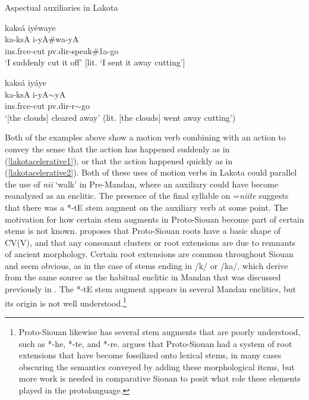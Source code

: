 \begin{exe}

\item\label{lakotacelerative} Aspectual auxiliaries in Lakota

	\begin{xlist}
	
	\item\label{lakotacelerative1}
	\glll kaksá iyéwaye\\
	ka-ksA i-yA\#wa-yA\\
	ins.frce-\textnormal{cut} pv.dir-\textnormal{speak}\#1a-\textnormal{go}\\
	\glt `I suddenly cut it off' [lit. `I sent it away cutting'] \citep[38]{ingham2003}

	\item\label{lakotacelerative2}
	\glll kaksá iyáye\\
	ka-ksA i-yA$\sim$yA\\
	ins.frce-\textnormal{cut} pv.dir-r$\sim$\textnormal{go}\\
	\glt `[the clouds] cleared away' (lit. [the clouds] went away cutting') \citep[38]{ingham2003}
	
	\end{xlist}

\end{exe}

Both of the examples above show a motion verb combining with an action to convey the sense that the action has happened suddenly as in (\ref{lakotacelerative1}), or that the action happened quickly as in (\ref{lakotacelerative2}). Both of these uses of motion verbs in Lakota could parallel the use of \textit{nii} `walk' in Pre-Mandan, where an auxiliary could have become reanalyzed as an enclitic. The presence of the final syllable on =\textit{niite} suggests that there was a *-tE stem augment on the auxiliary verb at some point. The motivation for how certain stem augments in Proto-Siouan become part of certain stems is not known. \citet[512]{jones1991} proposes that Proto-Siouan roots have a basic shape of CV(V), and that any consonant clusters or root extensions are due to remnants of ancient morphology. Certain root extensions are common throughout Siouan and seem obvious, as in the case of stems ending in /k/ or /ka/, which derive from the same source as the habitual enclitic in Mandan that was discussed previously in . The *-tE stem augment appears in several Mandan enclitics, but its origin is not well understood.\footnote{Proto-Siouan likewise has several stem augments that are poorly understood, such as *-he, *-te, and *-re. \citet{jones1991} argues that Proto-Siouan had a system of root extensions that have become fossilized onto lexical stems, in many cases obscuring the semantics conveyed by adding these morphological items, but more work is needed in comparative Siouan to posit what role these elements played in the protolanguage.}


